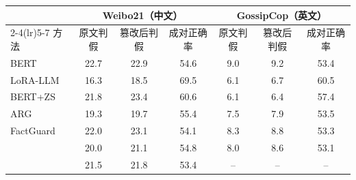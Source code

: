 \begin{tabular}{lcccccc}
\toprule
 & \multicolumn{3}{c}{Weibo21（中文）} & \multicolumn{3}{c}{GossipCop（英文）} \\
\cmidrule(lr){2-4}\cmidrule(lr){5-7}
方法 & 原文判假 & 篡改后判假 & 成对正确率 & 原文判假 & 篡改后判假 & 成对正确率 \\
\midrule
BERT & 22.7 & 22.9 & 54.6 & 9.0 & 9.2 & 53.4 \\
LoRA-LLM & 16.3 & 18.5 & 69.5 & 6.1 & 6.7 & 60.5 \\
BERT+ZS & 21.8 & 23.4 & 60.6 & 6.1 & 6.4 & 57.4 \\
ARG & 19.3 & 19.7 & 55.4 & 7.5 & 7.9 & 53.5 \\
FactGuard & 22.0 & 23.1 & 54.1 & 8.3 & 8.8 & 53.3 \\
\method{} & 20.0 & 21.1 & 54.8 & 8.0 & 8.6 & 53.1 \\
\student{} & 21.5 & 21.8 & 53.4 & -- & -- & -- \\
\bottomrule
\end{tabular}
